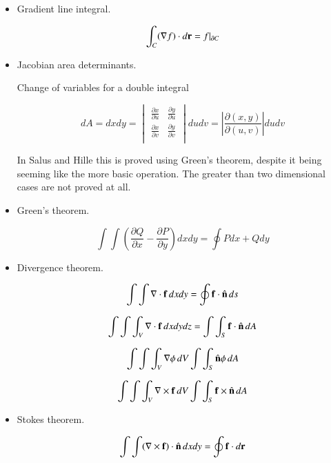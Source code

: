 \documentclass{article}
\newcommand{\grad}[0]{\nabla}
\newcommand{\PD}[2]{\frac{\partial {#2}}{\partial {#1}}}
\newcommand{\Abs}[1]{\left\lvert{#1}\right\rvert}
\begin{document}
\begin{itemize}

\item Gradient line integral. 

\begin{equation}\label{eqn:lineintegral}
\int_C (\grad f) \cdot d\Br = f \vert_{\partial C}
\end{equation}

\item Jacobian area determinants. 

Change of variables for a double integral

\begin{equation}
dA = dx dy =
\begin{vmatrix}
\PD{u}{x} & \PD{u}{y} \\
\PD{v}{x} & \PD{v}{y} \\
\end{vmatrix}
du dv
= \Abs{ \PD{(u,v)}{(x,y)} } du dv
\end{equation}

In Salus and Hille this is proved using Green's theorem, despite it 
being seeming like the more basic operation.  The greater than two
dimensional cases are not proved at all.

\item Green's theorem. 

\begin{equation}\label{eqn:greens}
\int\int \left(\PD{x}{Q} - \PD{y}{P}\right) dx dy = \oint P dx + Q dy
\end{equation}

\item Divergence theorem. 

\begin{equation}\label{eqn:divergenceplane}
\int\int \grad \cdot \Bf\, dx dy = \oint \Bf \cdot \ncap\, ds
\end{equation}

\begin{equation}\label{eqn:divergencevolume}
\int\int\int_V \grad \cdot \Bf\, dx dy dz = \int\int_S \Bf \cdot \ncap\, dA
\end{equation}

\begin{equation}\label{eqn:divergencegrad}
\int\int\int_V \grad \phi\, dV \int\int_S \ncap \phi\, dA
\end{equation}

\begin{equation}\label{eqn:divergencegradcross}
\int\int\int_V \grad \cross \Bf\, dV \int\int_S \Bf \cross \ncap\, dA
\end{equation}

\item Stokes theorem. 

\begin{equation}\label{eqn:stokes}
\int\int (\grad \cross \Bf) \cdot \ncap\, dx dy = \oint \Bf \cdot d\Br
\end{equation}

\end{itemize}
\end{document}
